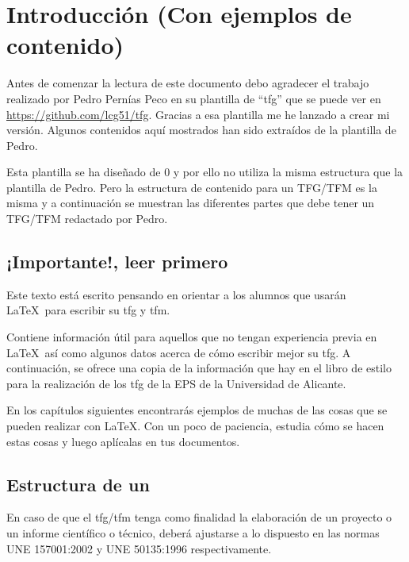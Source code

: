 
\chapter{Introducción (Con ejemplos de contenido)}

Antes de comenzar la lectura de este documento debo agradecer el trabajo realizado por Pedro Pernías Peco en su plantilla de ``tfg'' que se puede ver en \url{https://github.com/lcg51/tfg}. Gracias a esa plantilla me he lanzado a crear mi versión. Algunos contenidos aquí mostrados han sido extraídos de la plantilla de Pedro. 
\\
\par Esta plantilla se ha diseñado de 0 y por ello no utiliza la misma estructura que la plantilla de Pedro. Pero la estructura de contenido para un TFG/TFM es la misma y a continuación se muestran las diferentes partes que debe tener un TFG/TFM redactado por Pedro.
\section{¡Importante!, leer primero}

Este texto está escrito pensando en orientar a los alumnos que usarán \LaTeX~para escribir su \gls{tfg} y \gls{tfm}. 
\\
\par Contiene información útil para aquellos que no tengan experiencia previa en \LaTeX~así como algunos datos acerca de cómo escribir mejor su \gls{tfg}.
A continuación, se ofrece una copia de la información que hay en el libro de estilo para la realización de los \gls{tfg} de la EPS de la Universidad de Alicante.

En los capítulos siguientes encontrarás ejemplos de muchas de las cosas que se pueden realizar con \LaTeX. Con un poco de paciencia, estudia cómo se hacen estas cosas y luego aplícalas en tus documentos.


\section{Estructura de un }

En caso de que el \gls{tfg}/\gls{tfm} tenga como finalidad la elaboración de un proyecto o un 
informe científico o técnico, deberá ajustarse a lo dispuesto en las normas UNE 
157001:2002 y UNE 50135:1996 respectivamente.

